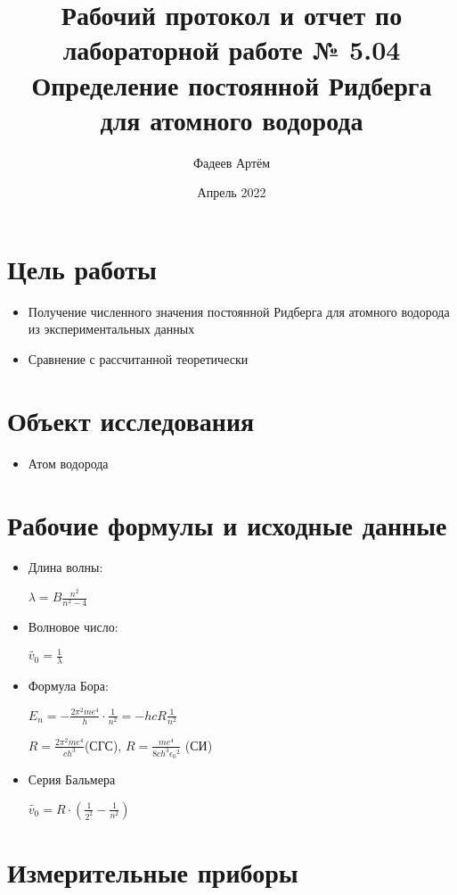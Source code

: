 \documentclass[12pt, a4paper]{article}
\title{Рабочий протокол и отчет по лабораторной работе № 5.04
\\ Определение постоянной Ридберга для атомного водорода
}
\author{Фадеев Артём }
\date{Апрель 2022}
\begin{document}
\maketitle
\section{Цель работы}

\begin{itemize}
    \item Получение численного значения постоянной Ридберга для атомного водорода из экспериментальных данных
    \item Сравнение с рассчитанной теоретически
\end{itemize}

\section{Объект исследования}

\begin{itemize}
    \item Атом водорода
\end{itemize}

\section{Рабочие формулы и исходные данные}

\begin{itemize}
    \item Длина волны:
    
    $\lambda = B \frac{n^2}{n^2 - 4}$
    \item Волновое число:
    
    $\tilde{v_0} = \frac{1}{\lambda}$
    \item Формула Бора:
    
    $E_n = -\frac{2 \pi^2 m e^4}{h} \cdot \frac{1}{n^2} = -hcR \frac{1}{n^2}$
    
    $R = \frac{2\pi^2 me^4}{ch^3}$(СГС), $R = \frac{me^4}{8ch^3{\epsilon_0}^2}$ (СИ)
    
    \item Серия Бальмера
    
    $\tilde{v_0} = R \cdot (\frac{1}{2^2} - \frac{1}{n^2})$
\end{itemize}

\section{Измерительные приборы}
\end{document}
